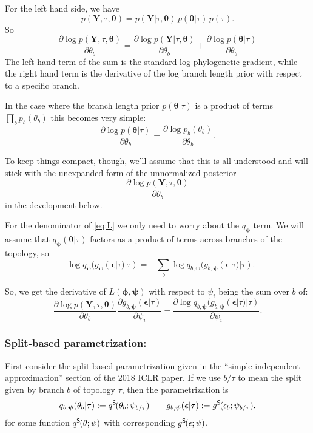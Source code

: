 \documentclass{article}
\newcommand{\qSplit}{q^\textsf{S}\hspace{-1pt}}
\newcommand{\gSplit}{g^\textsf{S}\hspace{-1pt}}
\begin{document}
For the left hand side, we have
\[
p(\bm{Y},\tau,\bm\theta) =
p(\bm{Y}|\tau,\bm\theta) \, p(\bm\theta | \tau) \, p(\tau).
\]
So
\begin{equation*}
\frac{\partial \log p(\bm{Y}, \tau, \bm\theta)}{\partial \theta_b} =
\frac{\partial \log p(\bm{Y} | \tau, \bm\theta)}{\partial \theta_b}
+
\frac{\partial \log p(\bm\theta | \tau)}{\partial \theta_b}
\end{equation*}
The left hand term of the sum is the standard log phylogenetic gradient, while the right hand term is the derivative of the log branch length prior with respect to a specific branch.

In the case where the branch length prior $p(\bm\theta | \tau)$ is a product of terms $\prod_b p_b(\theta_b)$ this becomes very simple:
\[
    \frac{\partial \log p(\bm\theta | \tau)}{\partial \theta_b} =
    \frac{\partial \log p_b(\theta_b)}{\partial \theta_b}.
\]

To keep things compact, though, we'll assume that this is all understood and will stick with the unexpanded form of the unnormalized posterior
\[
    \frac{\partial \log p(\bm{Y}, \tau, \bm\theta)}{\partial \theta_b}
\]
in the development below.

For the denominator of \eqref{eq:L} we only need to worry about the $q_{\bm\psi}$ term.
We will assume that $q_{\bm\psi}(\bm\theta | \tau)$ factors as a product of terms across branches of the topology, so
\[
    - \log q_{\bm{\psi}}(g_{\bm{\psi}}(\bm{\epsilon}|\tau)|\tau) =
    - \sum_b \log q_{b, \bm{\psi}}(g_{b, \bm{\psi}}(\bm{\epsilon}|\tau)|\tau).
\]

So, we get the derivative of $L(\bm\phi, \bm\psi)$ with respect to $\psi_i$ being the sum over $b$ of:
\begin{equation}
    \frac{\partial \log p(\bm{Y}, \tau, \bm\theta)}{\partial \theta_b}
    \frac{\partial g_{b,\bm\psi}(\bm\epsilon | \tau)}{\partial \psi_i}
    - \frac{\partial \log q_{b, \bm\psi}(g_{b, \bm\psi}(\bm\epsilon|\tau)|\tau)}{\partial \psi_i}.
    \label{eq:dLdPsi}
\end{equation}

\subsubsection*{Split-based parametrization:}
First consider the split-based parametrization given in the ``simple independent approximation'' section of the 2018 ICLR paper.
If we use $b \slash \tau$ to mean the split given by branch $b$ of topology $\tau$, then the parametrization is
\[
q_{b, \bm{\psi}}(\theta_b | \tau) := \qSplit(\theta_b; \psi_{b \slash \tau})
\qquad
g_{b,\bm\psi}(\bm\epsilon | \tau) := \gSplit(\epsilon_b; \psi_{b \slash \tau}).
\]
for some function $\qSplit(\theta; \psi)$ with corresponding $\gSplit(\epsilon; \psi)$.
\end{document}
